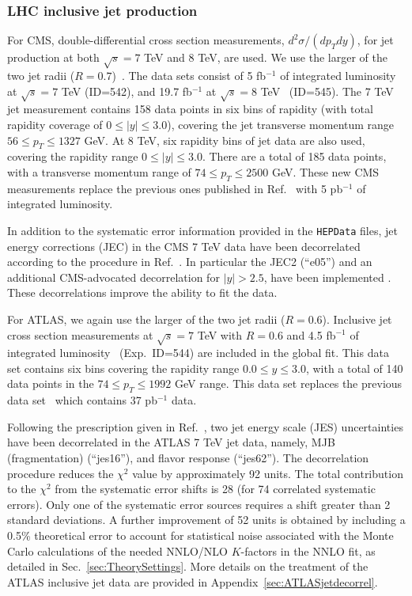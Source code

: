 \subsubsection{LHC inclusive jet production
\label{sec:DataJets}
}
For CMS, double-differential cross section measurements, $d^2\sigma /(dp_T dy)$, for jet production at both $\sqrt{s}=7$ TeV and 8 TeV, are used. 
We use the larger of the two jet radii ($R=0.7$)~\cite{Chatrchyan:2014gia}. 
The data sets consist of  5 fb$^{-1}$ of integrated luminosity at $\sqrt{s}=7$ TeV (ID=542), and 19.7 fb$^{-1}$ at $\sqrt{s}=8$ TeV~\cite{Khachatryan:2016mlc} (ID=545). The 7 TeV jet measurement contains 158 data points  in six bins of rapidity (with total rapidity coverage of $0\leq |y|\leq 3.0$),
covering the jet transverse momentum range $56\leq p_T\leq 1327$ GeV. At 8 TeV,  six rapidity bins of jet data are also used, covering the rapidity range $0\leq |y|\leq 3.0$.  There are a total of 185 data points, with a transverse momentum range of  $74\leq p_T\leq 2500$ GeV. 
These new CMS measurements replace the previous ones published in Ref.~\cite{Chatrchyan:2012bja} with 5 pb$^{-1}$ of integrated luminosity.  

In addition to the systematic error information provided in the \texttt{HEPData} files, jet energy corrections (JEC) in the CMS 7 TeV data have been decorrelated  according to the procedure in Ref.~\cite{Khachatryan:2014waa}.  In particular the JEC2 (``e05'') and an additional CMS-advocated decorrelation for $|y|>2.5$, have been implemented \cite{Voutilainen}. These decorrelations  improve the ability to fit the data. 

For ATLAS, we again use the larger of the two jet radii ($R=0.6$). Inclusive jet cross section measurements at $\sqrt{s}=7$ TeV with $R=0.6$ and 4.5 fb$^{-1}$ of integrated luminosity~\cite{Aad:2014vwa}  (Exp.~ID=544) are included in the global fit. 
This data set contains six bins covering the rapidity range $0.0 \leq y \leq 3.0$, with a total of 140 data points in the $74\leq p_T\leq 1992$ GeV range.
This data set replaces the previous data set~\cite{Aad:2011fc} which contains 37 pb$^{-1}$ data. 
 
Following the prescription given in Ref.~\cite{Aaboud:2017dvo}, two jet energy scale (JES) uncertainties have been decorrelated in the ATLAS 7 TeV jet data, namely, MJB (fragmentation) (``jes16''), and flavor response (``jes62'').
The decorrelation procedure reduces the $\chi^2$ value by approximately 92 units. The total contribution to the $\chi^2$ from the systematic error shifts is 28 (for 74 correlated systematic errors).
Only one of the systematic error sources requires a shift greater than 2 standard deviations. A further improvement of 52 units is obtained by including a 0.5\% theoretical error to account for
statistical noise associated with the Monte Carlo calculations of the needed NNLO/NLO $K$-factors \cite{Currie:2016bfm,Currie:2017ctp,Currie:2018xkj} in the NNLO fit, as detailed in Sec.~\ref{sec:TheorySettings}.
More details on the treatment of the ATLAS inclusive jet data are provided in Appendix~\ref{sec:ATLASjetdecorrel}.

